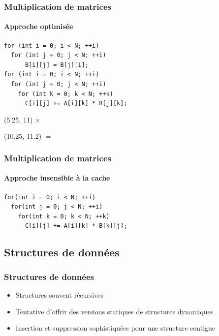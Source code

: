 \documentclass{beamer}
\begin{document}
\begin{frame}[fragile]
\frametitle{Multiplication de matrices}
\framesubtitle{Approche optimisée}
\begin{lstlisting}
for (int i = 0; i < N; ++i)
  for (int j = 0; j < N; ++i)
      B[i][j] = B[j][i];
for (int i = 0; i < N; ++i)
  for (int j = 0; j < N; ++i)
    for (int k = 0; k < N; ++k)
      C[i][j] += A[i][k] * B[j][k];
\end{lstlisting}


\begin{textblock}{5}(5.25, 11)
	 \Huge{$\times$}
\end{textblock}

\begin{textblock}{5}(10.25, 11.2)
	 \Huge{$=$}
\end{textblock}
\end{frame}

\begin{frame}[fragile]
\frametitle{Multiplication de matrices}
\framesubtitle{Approche insensible à la cache}
\begin{lstlisting}
for(int i = 0; i < N; ++i)
  for(int j = 0; j < N; ++i)
    for(int k = 0; k < N; ++k)
      C[i][j] += A[i][k] * B[k][j];
\end{lstlisting}
\end{frame}

\subsection{Structures de données}
\begin{frame}
\frametitle{Structures de données}
\begin{itemize}
\item Structures souvent récursives
\item Tentative d'offrir des versions statiques de structures dynamiques
\item Insertion et suppression sophistiquées pour une structure contigue
\end{itemize}
\end{frame}
\end{document}
